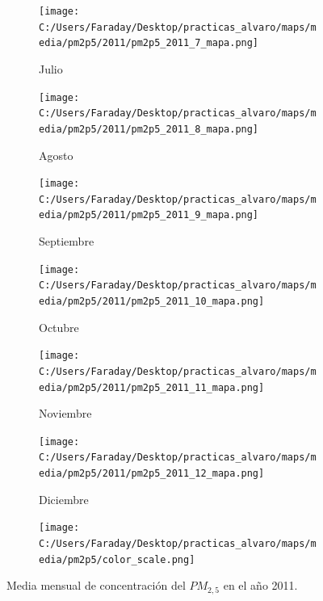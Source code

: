 \documentclass[12pt]{article}
\begin{document}
\begin{figure}[H]
\begin{subfigure}[H]{0.15\textwidth}
\texttt{[image: C:/Users/Faraday/Desktop/practicas\_alvaro/maps/media/pm2p5/2011/pm2p5\_2011\_7\_mapa.png]}
\captionsetup{labelformat=empty}
\caption{Julio}
\label{fig:map-pm2p5-2011-7}
\end{subfigure}
%
\begin{subfigure}[H]{0.15\textwidth}
\texttt{[image: C:/Users/Faraday/Desktop/practicas\_alvaro/maps/media/pm2p5/2011/pm2p5\_2011\_8\_mapa.png]}
\captionsetup{labelformat=empty}
\caption{Agosto}
\label{fig:map-pm2p5-2011-8}
\end{subfigure}
%
\begin{subfigure}[H]{0.15\textwidth}
\texttt{[image: C:/Users/Faraday/Desktop/practicas\_alvaro/maps/media/pm2p5/2011/pm2p5\_2011\_9\_mapa.png]}
\captionsetup{labelformat=empty}
\caption{Septiembre}
\label{fig:map-pm2p5-2011-9}
\end{subfigure}
%
\begin{subfigure}[H]{0.15\textwidth}
\texttt{[image: C:/Users/Faraday/Desktop/practicas\_alvaro/maps/media/pm2p5/2011/pm2p5\_2011\_10\_mapa.png]}
\captionsetup{labelformat=empty}
\caption{Octubre}
\label{fig:map-pm2p5-2011-10}
\end{subfigure}
%
\begin{subfigure}[H]{0.15\textwidth}
\texttt{[image: C:/Users/Faraday/Desktop/practicas\_alvaro/maps/media/pm2p5/2011/pm2p5\_2011\_11\_mapa.png]}
\captionsetup{labelformat=empty}
\caption{Noviembre}
\label{fig:map-pm2p5-2011-11}
\end{subfigure}
%
\begin{subfigure}[H]{0.15\textwidth}
\texttt{[image: C:/Users/Faraday/Desktop/practicas\_alvaro/maps/media/pm2p5/2011/pm2p5\_2011\_12\_mapa.png]}
\captionsetup{labelformat=empty}
\caption{Diciembre}
\label{fig:map-pm2p5-2011-12}
\end{subfigure}

\begin{subfigure}[H]{0.45\textwidth}
\texttt{[image: C:/Users/Faraday/Desktop/practicas\_alvaro/maps/media/pm2p5/color\_scale.png]}
\captionsetup{labelformat=empty}
\caption{}
\end{subfigure}

\vspace*{-7mm}
\caption{Media mensual de concentración del $PM_{2,5}$ en el año 2011.}
\label{fig:map-pm2p5-2011}
\end{figure}
\end{document}
